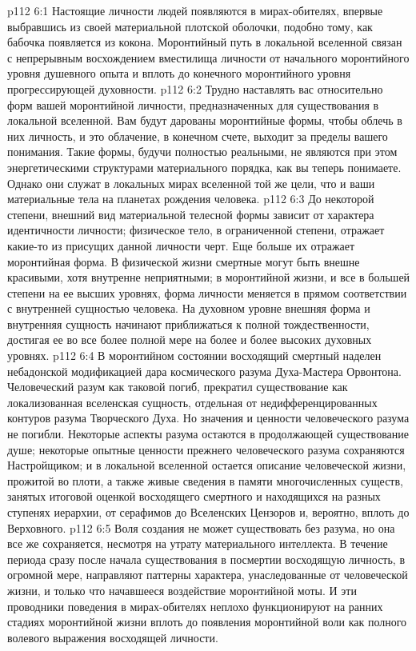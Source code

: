 \vs p112 6:1 Настоящие личности людей появляются в мирах\hyp{}обителях, впервые выбравшись из своей материальной плотской оболочки, подобно тому, как бабочка появляется из кокона. Моронтийный путь в локальной вселенной связан с непрерывным восхождением вместилища личности от начального моронтийного уровня душевного опыта и вплоть до конечного моронтийного уровня прогрессирующей духовности.
\vs p112 6:2 Трудно наставлять вас относительно форм вашей моронтийной личности, предназначенных для существования в локальной вселенной. Вам будут дарованы моронтийные формы, чтобы облечь в них личность, и это облачение, в конечном счете, выходит за пределы вашего понимания. Такие формы, будучи полностью реальными, не являются при этом энергетическими структурами материального порядка, как вы теперь понимаете. Однако они служат в локальных мирах вселенной той же цели, что и ваши материальные тела на планетах рождения человека.
\vs p112 6:3 До некоторой степени, внешний вид материальной телесной формы зависит от характера идентичности личности; физическое тело, в ограниченной степени, отражает какие\hyp{}то из присущих данной личности черт. Еще больше их отражает моронтийная форма. В физической жизни смертные могут быть внешне красивыми, хотя внутренне неприятными; в моронтийной жизни, и все в большей степени на ее высших уровнях, форма личности меняется в прямом соответствии с внутренней сущностью человека. На духовном уровне внешняя форма и внутренняя сущность начинают приближаться к полной тождественности, достигая ее во все более полной мере на более и более высоких духовных уровнях.
\vs p112 6:4 \pc В моронтийном состоянии восходящий смертный наделен небадонской модификацией дара космического разума Духа\hyp{}Мастера Орвонтона. Человеческий разум как таковой погиб, прекратил существование как локализованная вселенская сущность, отдельная от недифференцированных контуров разума Творческого Духа. Но значения и ценности человеческого разума не погибли. Некоторые аспекты разума остаются в продолжающей существование душе; некоторые опытные ценности прежнего человеческого разума сохраняются Настройщиком; и в локальной вселенной остается описание человеческой жизни, прожитой во плоти, а также живые сведения в памяти многочисленных существ, занятых итоговой оценкой восходящего смертного и находящихся на разных ступенях иерархии, от серафимов до Вселенских Цензоров и, вероятно, вплоть до Верховного.
\vs p112 6:5 Воля создания не может существовать без разума, но она все же сохраняется, несмотря на утрату материального интеллекта. В течение периода сразу после начала существования в посмертии восходящую личность, в огромной мере, направляют паттерны характера, унаследованные от человеческой жизни, и только что начавшееся воздействие моронтийной моты. И эти проводники поведения в мирах\hyp{}обителях неплохо функционируют на ранних стадиях моронтийной жизни вплоть до появления моронтийной воли как полного волевого выражения восходящей личности.
